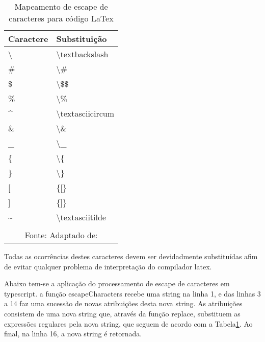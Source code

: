 \begin{table}[H]
    \centering
    \caption{Mapeamento de escape de caracteres para código LaTex}
    \label{tbl:escape-characters}
    \renewcommand{\arraystretch}{1.5}
    \begin{tabular}{p{2.5600cm} p{3.8400cm}}
        \hline
        \textbf{Caractere} & \textbf{Substituição} \\
        \hline
        \textbackslash  & \textbackslash textbackslash  \\
		\# & \textbackslash \# \\
		\$ & \textbackslash \$\$ \\
		\% & \textbackslash \% \\
		\textasciicircum  & \textbackslash textasciicircum  \\
		\& & \textbackslash \& \\
		\_ & \textbackslash \_ \\
		\{ & \textbackslash \{ \\
		\} & \textbackslash \} \\
		{[} & \{{[}\} \\
		{]} & \{{]}\} \\
		\textasciitilde  & \textbackslash textasciitilde  \\
        \hline
        \\\multicolumn{2}{c}{\fontsize{10pt}{12pt}Fonte: Adaptado de: \cite{tutorial-latex}}
    \end{tabular}
\end{table}

Todas as ocorrências destes caracteres devem ser devidadmente
substituídas afim de evitar qualquer problema de interpretação do
compilador
\acrshort{latex}.


Abaixo tem-se a aplicação do processamento de escape de caracteres
em typescript. a função escapeCharacters recebe uma string na linha 1,
e das linhas 3 a 14 faz uma sucessão de novas atribuições desta nova string.
As atribuições consistem de uma nova string que, através da função replace,
substituem as expressões regulares pela nova string, que seguem de acordo
com a
Tabela\ref{tbl:escape-characters}.
Ao final, na linha 16, a nova string é retornada.

